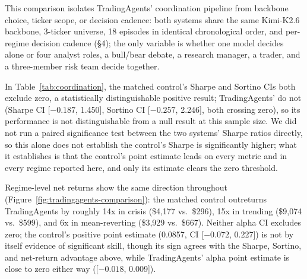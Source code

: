 \documentclass{article}
\begin{document}
This comparison isolates TradingAgents' coordination pipeline from backbone choice, ticker scope, or decision cadence: both systems share the same Kimi-K2.6 backbone, 3-ticker universe, 18 episodes in identical chronological order, and per-regime decision cadence (\S4); the only variable is whether one model decides alone or four analyst roles, a bull/bear debate, a research manager, a trader, and a three-member risk team decide together.

\begin{table}[!ht]
  \caption{TradingAgents versus a matched single-agent Kimi-K2.6 control.}
  \label{tab:coordination}
  \centering
\end{table}

In Table~\ref{tab:coordination}, the matched control's Sharpe and Sortino CIs both exclude zero, a statistically distinguishable positive result; TradingAgents' do not (Sharpe CI [$-0.187$, 1.450], Sortino CI [$-0.257$, 2.246], both crossing zero), so its performance is not distinguishable from a null result at this sample size. We did not run a paired significance test between the two systems' Sharpe ratios directly, so this alone does not establish the control's Sharpe is significantly higher; what it establishes is that the control's point estimate leads on every metric and in every regime reported here, and only its estimate clears the zero threshold.

Regime-level net returns show the same direction throughout (Figure~\ref{fig:tradingagents-comparison}): the matched control outreturns TradingAgents by roughly 14x in crisis (\$4{,}177 vs.\ \$296), 15x in trending (\$9{,}074 vs.\ \$599), and 6x in mean-reverting (\$3{,}929 vs.\ \$667). Neither alpha CI excludes zero; the control's positive point estimate (0.0857, CI [$-0.072$, 0.227]) is not by itself evidence of significant skill, though its sign agrees with the Sharpe, Sortino, and net-return advantage above, while TradingAgents' alpha point estimate is close to zero either way ([$-0.018$, 0.009]).
\end{document}

